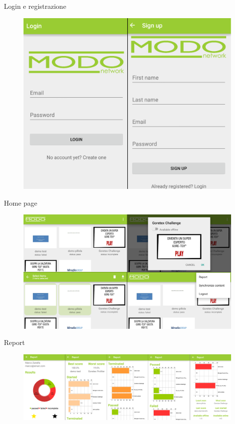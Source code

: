\documentclass[aspectratio=43]{beamer}
\begin{document}
	\begin{frame}{Login e registrazione}
		\begin{figure}[H]
			\centering
			\includegraphics[scale=0.13]{images/prodotto_finale/loginSignUp}
		\end{figure}
	\end{frame}

	\begin{frame}{Home page}
		\begin{figure}[H]
			\centering
			\includegraphics[scale=0.13]{images/prodotto_finale/homex4}
		\end{figure}
	\end{frame}

	\begin{frame}{Report}
		\begin{figure}[H]
			\centering
			\includegraphics[scale=0.089]{images/prodotto_finale/report_tot}
		\end{figure}
	\end{frame}
\end{document}
